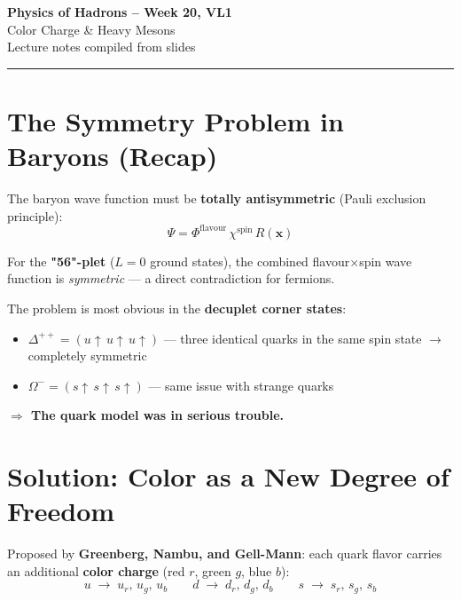 \documentclass[11pt,a4paper]{article}
\newcommand{\important}[1]{{\color{alertred}\textbf{#1}}}
\newcommand{\keyword}[1]{\textbf{#1}}
\begin{document}
\begin{center}
  {\LARGE\bfseries\color{navyblue} Physics of Hadrons -- Week 20, VL1}\\[6pt]
  {\large\color{midblue} Color Charge \& Heavy Mesons}\\[4pt]
  {\small\color{notegray} Lecture notes compiled from slides}
\end{center}
\vspace{-4pt}
{\color{navyblue}\rule{\linewidth}{1pt}}
\vspace{8pt}

\section{The Symmetry Problem in Baryons (Recap)}

The baryon wave function must be \keyword{totally antisymmetric} (Pauli exclusion principle):
\[
  \Psi = \Phi^{\mathrm{flavour}}\, \chi^{\mathrm{spin}}\, R(\mathbf{x})
\]

For the \keyword{"56"-plet} ($L=0$ ground states), the combined flavour$\times$spin wave function
is \emph{symmetric} --- a direct contradiction for fermions.

The problem is most obvious in the \keyword{decuplet corner states}:
\begin{itemize}
  \item $\Delta^{++} = (u{\uparrow}\, u{\uparrow}\, u{\uparrow})$ --- three identical quarks in the
        same spin state $\to$ completely symmetric
  \item $\Omega^{-} = (s{\uparrow}\, s{\uparrow}\, s{\uparrow})$ --- same issue with strange quarks
\end{itemize}

\important{$\Rightarrow$ The quark model was in serious trouble.}

\section{Solution: Color as a New Degree of Freedom}

Proposed by \keyword{Greenberg, Nambu, and Gell-Mann}: each quark flavor carries an additional
\keyword{color charge} (red $r$, green $g$, blue $b$):
\[
  u \;\to\; u_r,\, u_g,\, u_b \qquad
  d \;\to\; d_r,\, d_g,\, d_b \qquad
  s \;\to\; s_r,\, s_g,\, s_b
\]
\end{document}
